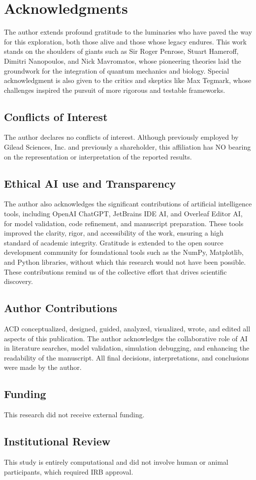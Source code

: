 \documentclass[entropy,article,submit,oneauthor,pdftex,]{Definitions/mdpi}
\begin{document}
\section{Acknowledgments} 
The author extends profound gratitude to the luminaries who have paved the way for this exploration, both those alive and those whose legacy endures. This work stands on the shoulders of giants such as Sir Roger Penrose, Stuart Hameroff, Dimitri Nanopoulos, and  Nick Mavromatos, whose pioneering theories laid the groundwork for the integration of  quantum mechanics and biology. Special acknowledgment is also given to the critics and skeptics like Max Tegmark, whose challenges inspired the pursuit of more rigorous and testable frameworks. 
\subsection{Conflicts of Interest} 
The author declares no conflicts of interest. Although previously employed by Gilead Sciences, Inc. and previously a shareholder, this affiliation has NO bearing on the representation or interpretation of the reported results.  
\subsection{Ethical AI use and Transparency} 
The author also acknowledges the significant contributions of artificial intelligence tools,  including OpenAI ChatGPT, JetBrains IDE AI, and Overleaf Editor AI, for model validation,  code refinement, and manuscript preparation. These tools improved the clarity, rigor, and accessibility of the work, ensuring a high standard of academic integrity. 
Gratitude is extended to the open source development community for foundational tools such as the NumPy, Matplotlib, and Python libraries, without which this research would not have been possible. 
These contributions remind us of the collective effort that drives
scientific discovery. 
\subsection{Author Contributions} 
ACD conceptualized, designed, guided, analyzed, visualized, wrote, and edited all aspects of this publication. The author acknowledges the collaborative role of AI in literature searches, model validation, simulation debugging, and enhancing the readability of the manuscript. All final decisions, interpretations, and conclusions were made by the author. 
\subsection{Funding} 
This research did not receive external funding. 
\subsection{Institutional Review} 
This study is entirely computational and did not involve human or animal participants,  which required IRB approval. 
\end{document}
